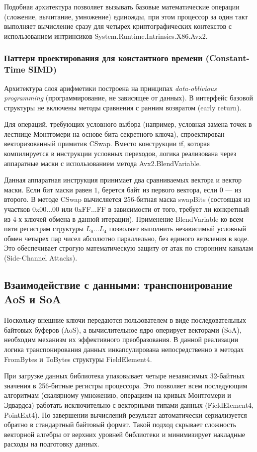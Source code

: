 Подобная архитектура позволяет вызывать базовые математические операции (сложение, вычитание, умножение) единожды, при этом процессор за один такт выполняет вычисление сразу для четырех криптографических контекстов с использованием интринсиков System.Runtime.Intrinsics.X86.Avx2.

\subsubsection{Паттерн проектирования для константного времени (Constant-Time SIMD)}

Архитектура слоя арифметики построена на принципах \textit{data-oblivious programming} (программирование, не зависящее от данных). В интерфейс базовой структуры не включены методы сравнения с ранним возвратом (early return).

Для операций, требующих условного выбора (например, условная замена точек в лестнице Монтгомери на основе бита секретного ключа), спроектирован векторизованный примитив CSwap. Вместо конструкции if, которая компилируется в инструкции условных переходов, логика реализована через аппаратные маски с использованием метода Avx2.BlendVariable.

Данная аппаратная инструкция принимает два сравниваемых вектора и вектор маски. Если бит маски равен $1$, берется байт из первого вектора, если $0$ — из второго. В методе CSwap вычисляется 256-битная маска swapBits (состоящая из участков 0x00...00 или 0xFF...FF в зависимости от того, требует ли конкретный из 4-х ключей обмена в данной итерации). 
Применение BlendVariable ко всем пяти регистрам структуры $L_0 \dots L_4$ позволяет выполнить независимый условный обмен четырех пар чисел абсолютно параллельно, без единого ветвления в коде. Это обеспечивает строгую математическую защиту от атак по сторонним каналам (Side-Channel Attacks).

\subsection{Взаимодействие с данными: транспонирование AoS и SoA}

Поскольку внешние ключи передаются пользователем в виде последовательных байтовых буферов (AoS), а вычислительное ядро оперирует векторами (SoA), необходим механизм их эффективного преобразования. В данной реализации логика транспонирования данных инкапсулирована непосредственно в методах FromBytes и ToBytes структуры FieldElement4.

При загрузке данных библиотека упаковывает четыре независимых 32-байтных значения в 256-битные регистры процессора. Это позволяет всем последующим алгоритмам (скалярному умножению, операциям на кривых Монтгомери и Эдвардса) работать исключительно с векторными типами данных (FieldElement4, PointExt4). По завершении вычислений результат автоматически сериализуется обратно в стандартный байтовый формат. Такой подход скрывает сложность векторной алгебры от верхних уровней библиотеки и минимизирует накладные расходы на подготовку данных.
